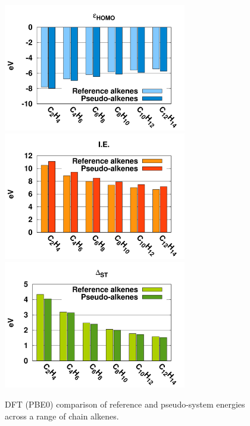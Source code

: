 \documentclass[12pt]{article}
\begin{document}
\begin{figure}
\begin{center}
\includegraphics[width=8cm]{short_pbe0_homo}
\includegraphics[width=8cm]{short_pbe0_ie}
\includegraphics[width=8cm]{short_pbe0_st}
\end{center}
\vspace{0.25in}
\hspace*{3in}

\caption{DFT (PBE0) comparison of reference and pseudo-system energies across a range of chain alkenes.}
\label{fig:alkenes_hf_dft}
\end{figure}
\end{document}
